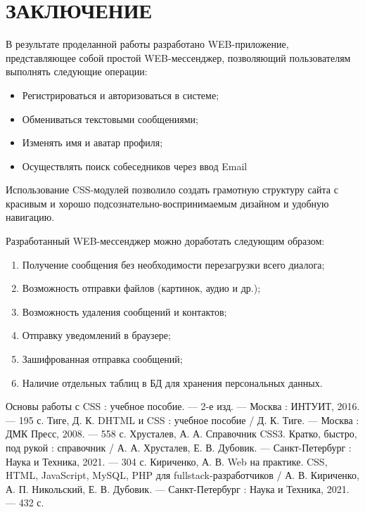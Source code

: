 \documentclass[14pt,final]{report}
\begin{document}
\chapter*{ЗАКЛЮЧЕНИЕ}
В результате проделанной работы разработано WEB-приложение, представляющее собой простой WEB-мессенджер, позволяющий пользователям выполнять следующие операции:
\begin{itemize}
    \item Регистрироваться и авторизоваться в системе;
    \item Обмениваться текстовыми сообщениями;
    \item Изменять имя и аватар профиля;
    \item Осуществлять поиск собеседников через ввод Email
\end{itemize}
\par
Использование CSS-модулей позволило создать грамотную структуру сайта с красивым и хорошо подсознательно-воспринимаемым дизайном и удобную навигацию.
\par
Разработанный WEB-мессенджер можно доработать следующим образом:
\begin{enumerate}
    \item Получение сообщения без необходимости перезагрузки всего диалога;
    \item Возможность отправки файлов (картинок, аудио и др.);
    \item Возможность удаления сообщений и контактов;
    \item Отправку уведомлений в браузере;
    \item Зашифрованная отправка сообщений;
    \item Наличие отдельных таблиц в БД для хранения персональных данных.
\end{enumerate}

\begin{thebibliography}{99}
\bibitem{} Основы работы с CSS : учебное пособие. — 2-е изд. — Москва : ИНТУИТ, 2016. — 195 с.
\bibitem{} Тиге, Д. К. DHTML и CSS : учебное пособие / Д. К. Тиге. — Москва : ДМК Пресс, 2008. — 558 с.
\bibitem{} Хрусталев, А. А. Справочник CSS3. Кратко, быстро, под рукой : справочник / А. А. Хрусталев, Е. В. Дубовик. — Санкт-Петербург : Наука и Техника, 2021. — 304 с. 
\bibitem{} Кириченко, А. В. Web на практике. CSS, HTML, JavaScript, MySQL, PHP для fullstack-разработчиков / А. В. Кириченко, А. П. Никольский, Е. В. Дубовик. — Санкт-Петербург : Наука и Техника, 2021. — 432 с.
\end{thebibliography}

\appendices
\end{document}
